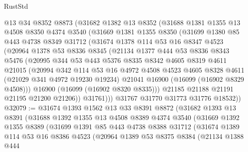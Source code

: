 \begin{lexlean}{RustStd}
\begin{coremodule}
    @13
    @34
    @8352
    @8873
    (@31682
      @1382
      @13
      @8352
      (@31688
        @1381
        @1355
        @13
        @4508
        @8350
        @4374
        @3540
        (@31669
          @1381
          @1355
          @8350
          (@31699
            @1380
            @85
            @443
            @4738
            @8349
            @31712
            (@31674
              @1378
              @114
              @53
              @16
              @8347
              @4523
              (@20964
                @1378
                @53
                @8336
                @8345
                (@21134
                  @1377
                  @444
                  @53
                  @8336
                  @8343
                  @5476
                  (@20995
                    @344
                    @53
                    @443
                    @5376
                    @8335
                    @8342
                    @4605
                    @8319
                    @4611
                    @21015
                    (@20994
                      @342
                      @114
                      @53
                      @16
                      @4972
                      @4508
                      @4523
                      @4605
                      @8328
                      @4611
                      (@21029 @341 @4972 @19230 @19234)
                      @21041
                      @16900
                      (@16099 (@16902 @8329 @4508)))
                    @16900
                    (@16099 (@16902 @8320 @8335)))
                  @21185
                  @21188
                  @21191
                  @21195
                  @21200
                  @21206))
              @31761)))
        @31767
        @31770
        @31773
        @31776
        @18532))
@32079 := @31674
    @1393
    @1562
    @13
    @33
    @8391
    @8872
    (@31682
      @1393
      @13
      @8391
      (@31688
        @1392
        @1355
        @13
        @4508
        @8389
        @4374
        @3540
        (@31669
          @1392
          @1355
          @8389
          (@31699
            @1391
            @85
            @443
            @4738
            @8388
            @31712
            (@31674
              @1389
              @114
              @53
              @16
              @8386
              @4523
              (@20964
                @1389
                @53
                @8375
                @8384
                (@21134
                  @1388
                  @444

\end{coremodule}
\end{lexlean}
